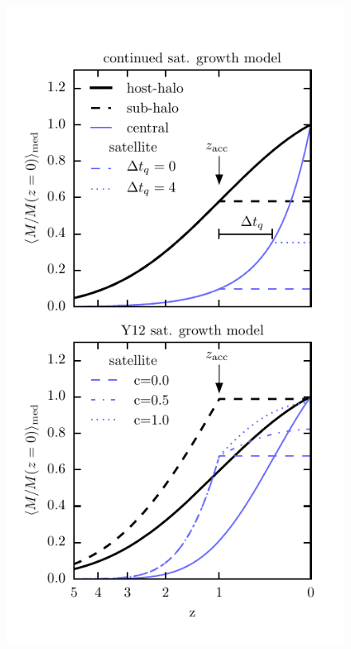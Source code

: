 \documentclass[useAMS,fleqn,usenatbib]{mnras}
\begin{document}
\begin{figure}
    \includegraphics[width=\columnwidth]{figures/sat_growth_model_2_panel.pdf}

\end{figure}
\end{document}
